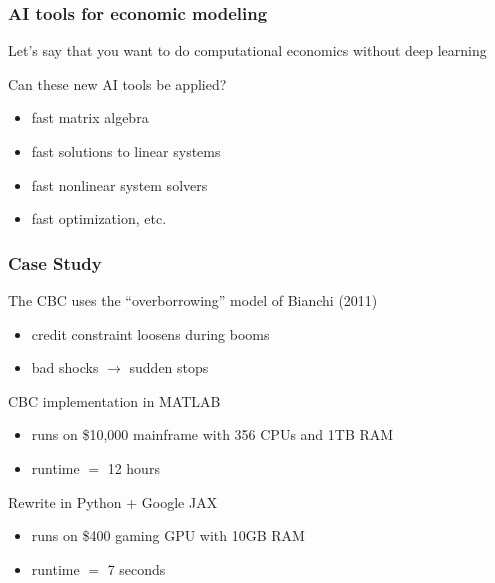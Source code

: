 \begin{frame}
    \frametitle{AI tools for economic modeling}

    Let's say that you want to do computational economics without deep learning

    \vspace{0.5em}
    Can these new AI tools be applied?

    \pause

    \vspace{0.5em}
    \vspace{0.5em}

    \begin{itemize}
        \item fast matrix algebra
        \vspace{0.5em}
        \item fast solutions to linear systems
        \vspace{0.5em}
        \item fast nonlinear system solvers
        \vspace{0.5em}
        \item fast optimization, etc.
    \end{itemize}


\end{frame}



\begin{frame}
    \frametitle{Case Study}

    The CBC uses the ``overborrowing'' model of Bianchi (2011)

    \begin{itemize}
        \item credit constraint loosens during booms
        \item bad shocks $\to$ sudden stops
    \end{itemize}

    \vspace{0.5em}
    CBC implementation in MATLAB 

    \begin{itemize}
        \item runs on \$10,000 mainframe with 356 CPUs and 1TB RAM
        \item runtime $=$ 12 hours
    \end{itemize}

    \pause
    \vspace{0.5em}
    Rewrite in Python + Google JAX

    \begin{itemize}
        \item runs on \$400 gaming GPU with 10GB RAM
        \item runtime $=$ 7 seconds
    \end{itemize}


\end{frame}






